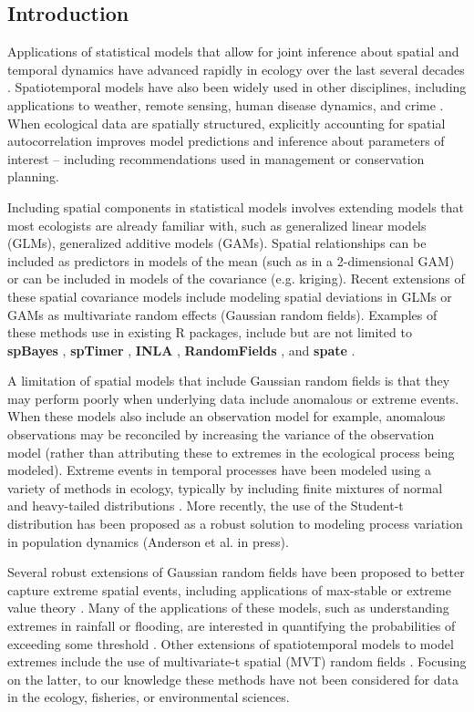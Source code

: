 \documentclass[12pt,english]{article}
\begin{document}
\begin{spacing}{1.25}
\section{Introduction}

Applications of statistical models that allow for joint inference about spatial
and temporal dynamics have advanced rapidly in ecology over the last several
decades \citep{bascompte1995, latimer2009}. Spatiotemporal models have also
been widely used in other disciplines, including applications to weather,
remote sensing, human disease dynamics, and crime \citep{cressie2011}. When
ecological data are spatially structured, explicitly accounting for spatial
autocorrelation improves model predictions and inference about parameters of
interest – including recommendations used in management or conservation planning.

Including spatial components in statistical models involves extending models
that most ecologists are already familiar with, such as generalized linear
models (GLMs), generalized additive models (GAMs). Spatial relationships can
be included as predictors in models of the mean (such as in a 2-dimensional
GAM) or can be included in models of the covariance (e.g. kriging). Recent
extensions of these spatial covariance models include modeling spatial
deviations in GLMs or GAMs as multivariate random effects (Gaussian random
fields). Examples of these methods use in existing R packages, include but are
not limited to \textbf{spBayes} \citep{finley2007}, \textbf{spTimer}
\citep{bakar2015}, \textbf{INLA} \citep{rue2009}, \textbf{RandomFields}
\citep{schlather2016}, and \textbf{spate} \citep{sigrist2015}.

A limitation of spatial models that include Gaussian random fields is that
they may perform poorly when underlying data include anomalous or extreme events.
When these models also include an observation model for example, anomalous
observations may be reconciled by increasing the variance of the observation
model (rather than attributing these to extremes in the ecological process being
modeled). Extreme events in temporal processes have been modeled using a variety
of methods in ecology, typically by including finite mixtures of normal and
heavy-tailed distributions \citep{everitt1996, ward2007, thorson2011}. More
recently, the use of the Student-t distribution has been proposed as a robust
solution to modeling process variation in population dynamics (Anderson et al.
in press).

Several robust extensions of Gaussian random fields have been proposed to
better capture extreme spatial events, including applications of max-stable or
extreme value theory \citep{davison2012, davison2012a}. Many of the
applications of these models, such as understanding extremes in rainfall or
flooding, are interested in quantifying the probabilities of exceeding some
threshold \citep{davis2008}. Other extensions of spatiotemporal models to model
extremes include the use of multivariate-t spatial (MVT) random fields
\citep{roislien2007}. Focusing on the latter, to our knowledge these methods
have not been considered for data in the ecology, fisheries, or environmental
sciences.


\end{spacing}
\end{document}
